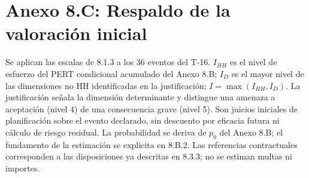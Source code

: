 \documentclass[carta,firma,sinnotas]{lafrox}
\begin{document}
\endgroup

\clearpage
\section{Anexo 8.C: Respaldo de la valoración inicial}

Se aplican las escalas de 8.1.3 a los 36 eventos del T-16. $I_{HH}$ es el nivel de esfuerzo del PERT condicional acumulado del Anexo 8.B; $I_D$ es el mayor nivel de las dimensiones no HH identificadas en la justificación; $I=\max(I_{HH},I_D)$. La justificación señala la dimensión determinante y distingue una amenaza a aceptación (nivel 4) de una consecuencia grave (nivel 5). Son juicios iniciales de planificación sobre el evento declarado, sin descuento por eficacia futura ni cálculo de riesgo residual. La probabilidad se deriva de $p_0$ del Anexo 8.B; el fundamento de la estimación se explicita en 8.B.2. Las referencias contractuales corresponden a las disposiciones ya descritas en 8.3.3; no se estiman multas ni importes.
\end{document}
